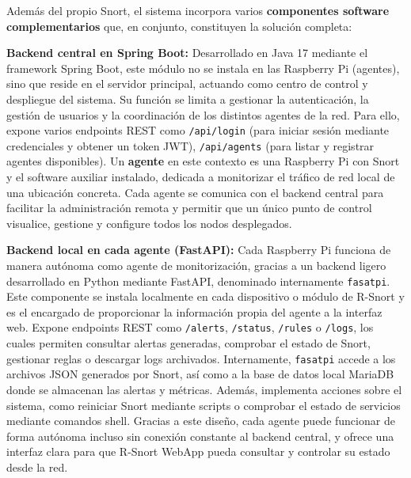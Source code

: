 \documentclass[11pt,a4paper,twoside]{report}
\begin{document}
Además del propio Snort, el sistema incorpora varios \textbf{componentes software complementarios} que, en conjunto, constituyen la solución completa:\newline

\textbf{Backend central en Spring Boot:}
Desarrollado en Java 17 mediante el framework Spring Boot, este módulo no se instala en las Raspberry Pi (agentes), sino que reside en el servidor principal, actuando como centro de control y despliegue del sistema. Su función se limita a gestionar la autenticación, la gestión de usuarios y la coordinación de los distintos agentes de la red. Para ello, expone varios endpoints REST como \texttt{/api/login} (para iniciar sesión mediante credenciales y obtener un token JWT), \texttt{/api/agents} (para listar y registrar agentes disponibles). Un \textbf{agente} en este contexto es una Raspberry Pi con Snort y el software auxiliar instalado, dedicada a monitorizar el tráfico de red local de una ubicación concreta. Cada agente se comunica con el backend central para facilitar la administración remota y permitir que un único punto de control visualice, gestione y configure todos los nodos desplegados.\newline

\textbf{Backend local en cada agente (FastAPI):}
Cada Raspberry Pi funciona de manera autónoma como agente de monitorización, gracias a un backend ligero desarrollado en Python mediante FastAPI, denominado internamente \texttt{fasatpi}. Este componente se instala localmente en cada dispositivo o módulo de R-Snort y es el encargado de proporcionar la información propia del agente a la interfaz web. Expone endpoints REST como \texttt{/alerts}, \texttt{/status}, \texttt{/rules} o \texttt{/logs}, los cuales permiten consultar alertas generadas, comprobar el estado de Snort, gestionar reglas o descargar logs archivados.
Internamente, \texttt{fasatpi} accede a los archivos JSON generados por Snort, así como a la base de datos local MariaDB donde se almacenan las alertas y métricas. Además, implementa acciones sobre el sistema, como reiniciar Snort mediante scripts o comprobar el estado de servicios mediante comandos shell. Gracias a este diseño, cada agente puede funcionar de forma autónoma incluso sin conexión constante al backend central, y ofrece una interfaz clara para que R-Snort WebApp pueda consultar y controlar su estado desde la red.\newline
\end{document}
